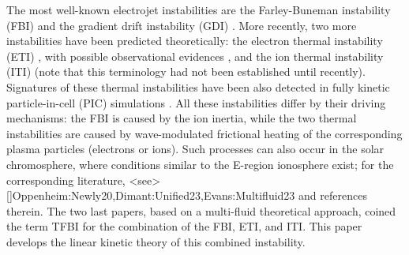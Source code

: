 \documentclass[draft]{agujournal2019}
\begin{document}
The most well-known electrojet instabilities are the Farley-Buneman instability (FBI)
\cite{Farley:Two-stream63,Buneman:Excitation63} and the gradient drift
instability (GDI) \cite{Simon:Instability63,Maeda:Theoretical63,Hoh:Instability63}. More
recently, two more instabilities have been predicted theoretically: the
electron thermal instability (ETI)
\cite{Dimant:Kinetic95b,Dimant:Physical97,Robinson:Effects:98,St.-Maurice:Role00}, with possible observational evidences
\cite{Blix:Experimental96,Tsunoda:Radar97}, and the ion thermal instability
(ITI) \cite{Kagan:Thermal00,Dimant:Ion_thermal04,Makarevich:Toward21} (note
that this terminology had not been established until recently). Signatures of
these thermal instabilities have been also detected in fully kinetic
particle-in-cell (PIC) simulations
\cite{Janhunen:Perpendicular94,Janhunen:Recent95,Oppenheim:Hybrid95,
Oppenheim:Saturation96,Oppenheim:Ion_thermal04,Oppenheim:Large08,Oppenheim:Kinetic13}. 
All these instabilities differ by their driving mechanisms: the FBI is
caused by the ion inertia, while the two thermal instabilities are caused by
wave-modulated frictional heating of the corresponding plasma particles
(electrons or ions). Such processes can also occur in the solar chromosphere,
where conditions similar to the E-region ionosphere exist; for the
corresponding literature, \citeA<see>[]{Oppenheim:Newly20,Dimant:Unified23,Evans:Multifluid23} and references
therein. The two last papers, based on a multi-fluid theoretical approach, coined the term TFBI for the combination of
the FBI, ETI, and ITI. This paper develops the linear kinetic theory of this
combined instability.
\end{document}
